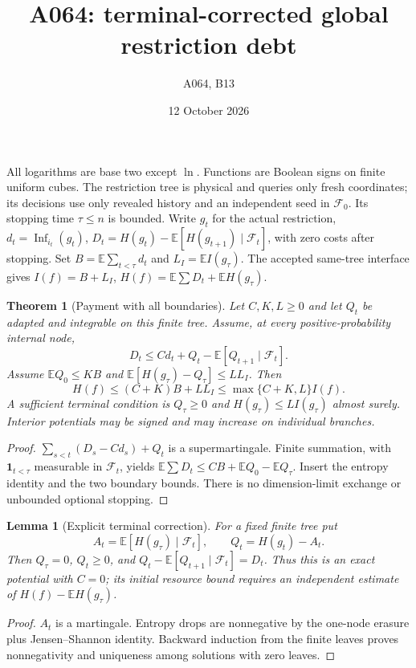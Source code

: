 \documentclass{article}
\newtheorem{theorem}{Theorem}
\newtheorem{lemma}{Lemma}
\begin{document}
\title{A064: terminal-corrected global restriction debt}
\author{A064, B13}\date{12 October 2026}\maketitle
All logarithms are base two except $\ln$. Functions are Boolean signs
on finite uniform cubes. The restriction tree is physical and queries only
fresh coordinates; its decisions use only revealed history and an independent
seed in $\mathcal F_0$. Its stopping time $\tau\le n$ is bounded. Write
$g_t$ for the actual restriction, $d_t=\operatorname{Inf}_{i_t}(g_t)$,
$D_t=H(g_t)-\mathbb E[H(g_{t+1})\mid\mathcal F_t]$, with zero costs
after stopping. Set $B=\mathbb E\sum_{t<\tau}d_t$ and
$L_I=\mathbb E I(g_\tau)$. The accepted same-tree interface gives
$I(f)=B+L_I$, $H(f)=\mathbb E\sum D_t+\mathbb EH(g_\tau)$.

\begin{theorem}[Payment with all boundaries]
Let $C,K,L\ge0$ and let $Q_t$ be adapted and integrable on this finite tree.
Assume, at every positive-probability internal node,
\[
D_t\le C d_t+Q_t-\mathbb E[Q_{t+1}\mid\mathcal F_t].
\]
Assume $\mathbb E Q_0\le KB$ and
$\mathbb E[H(g_\tau)-Q_\tau]\le L L_I$. Then
\[
H(f)\le(C+K)B+L L_I\le\max\{C+K,L\}I(f).
\]
A sufficient terminal condition is $Q_\tau\ge0$ and
$H(g_\tau)\le L I(g_\tau)$ almost surely. Interior potentials may
be signed and may increase on individual branches.
\end{theorem}
\begin{proof}
$\sum_{s<t}(D_s-Cd_s)+Q_t$ is a supermartingale. Finite summation,
with $\mathbf1_{t<\tau}$ measurable in $\mathcal F_t$, yields
$\mathbb E\sum D_t\le CB+\mathbb EQ_0-\mathbb EQ_\tau$.
Insert the entropy identity and the two boundary bounds. There is no
dimension-limit exchange or unbounded optional stopping.
\end{proof}

\begin{lemma}[Explicit terminal correction]
For a fixed finite tree put
\[
A_t=\mathbb E[H(g_\tau)\mid\mathcal F_t],\qquad
Q_t=H(g_t)-A_t.
\]
Then $Q_\tau=0$, $Q_t\ge0$, and
$Q_t-\mathbb E[Q_{t+1}\mid\mathcal F_t]=D_t$.
Thus this is an exact potential with $C=0$; its initial resource bound
requires an independent estimate of $H(f)-\mathbb EH(g_\tau)$.
\end{lemma}
\begin{proof}
$A_t$ is a martingale. Entropy drops are nonnegative by the one-node
erasure plus Jensen--Shannon identity. Backward induction from the finite
leaves proves nonnegativity and uniqueness among solutions with zero leaves.
\end{proof}
\end{document}
